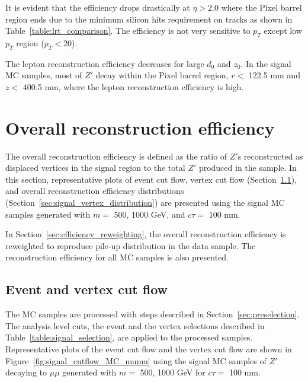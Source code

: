 It is evident that the efficiency drops drastically at $\eta > 2.0$ where the Pixel barrel region ends due to the minimum silicon hits requirement on tracks as shown in Table~\ref{table:lrt_comparison}. The efficiency is not very sensitive to $p_{T}$ except low $p_{T}$ region ($p_{T} < 20$).

The lepton reconstruction efficiency decreases for large $d_{0}$ and $z_{0}$. In the signal MC samples, most of $Z'$ decay within the Pixel barrel region, $r < $ 122.5 mm and $z < $ 400.5 mm, where the lepton reconstruction efficiency is high.

\section{Overall reconstruction efficiency}
\label{sec:combined_reco_efficiency}
The overall reconstruction efficiency is defined as the ratio of $Z'$s reconstructed as displaced vertices in the signal region to the total $Z'$ produced in the sample. In this section, representative plots of event cut flow, vertex cut flow (Section~\ref{sec:signal_cutflow}), and overall reconstruction efficiency distributions (Section~\ref{sec:signal_vertex_distribution}) are presented using the signal MC samples generated with $m=$ 500, 1000 GeV, and $c\tau=$ 100 mm.

In Section~\ref{sec:efficiency_reweighting}, the overall reconstruction efficiency is reweighted to reproduce pile-up distribution in the data sample. The reconstruction efficiency for all MC samples is also presented.


\subsection{Event and vertex cut flow}
\label{sec:signal_cutflow}
The MC samples are processed with steps described in Section~\ref{sec:preselection}. The analysis level cuts, the event and the vertex selections described in Table~\ref{table:signal_selection}, are applied to the processed samples. Representative plots of the event cut flow and the vertex cut flow are shown in Figure~\ref{fig:signal_cutflow_MC_mumu} using the signal MC samples of $Z'$ decaying to $\mu\mu$ generated with $m=$ 500, 1000 GeV for $c\tau=$ 100 mm.

